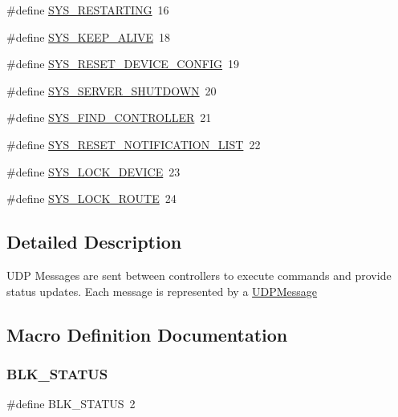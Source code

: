 \begin{DoxyCompactItemize}
\#define \hyperlink{group___u_d_p_message_i_d_ga9ed42f3a7fcc253fa49ce8ff33a75422}{S\+Y\+S\+\_\+\+R\+E\+S\+T\+A\+R\+T\+I\+NG}~16
\item 
\#define \hyperlink{group___u_d_p_message_i_d_ga596f44c285ab391c72addd0e803b0fc4}{S\+Y\+S\+\_\+\+K\+E\+E\+P\+\_\+\+A\+L\+I\+VE}~18
\item 
\#define \hyperlink{group___u_d_p_message_i_d_gaef042a9ee57e8ddf94286a3263734468}{S\+Y\+S\+\_\+\+R\+E\+S\+E\+T\+\_\+\+D\+E\+V\+I\+C\+E\+\_\+\+C\+O\+N\+F\+IG}~19
\item 
\#define \hyperlink{group___u_d_p_message_i_d_ga3021efce231e9a711d6f498630327086}{S\+Y\+S\+\_\+\+S\+E\+R\+V\+E\+R\+\_\+\+S\+H\+U\+T\+D\+O\+WN}~20
\item 
\#define \hyperlink{group___u_d_p_message_i_d_gadfda0e5a5a6a08de555dd55182a4cd87}{S\+Y\+S\+\_\+\+F\+I\+N\+D\+\_\+\+C\+O\+N\+T\+R\+O\+L\+L\+ER}~21
\item 
\#define \hyperlink{group___u_d_p_message_i_d_gab96f76ffa1af60bebfd871ca1e7c4a08}{S\+Y\+S\+\_\+\+R\+E\+S\+E\+T\+\_\+\+N\+O\+T\+I\+F\+I\+C\+A\+T\+I\+O\+N\+\_\+\+L\+I\+ST}~22
\item 
\#define \hyperlink{group___u_d_p_message_i_d_ga42644954a92421cfe92c2e3d20f795ce}{S\+Y\+S\+\_\+\+L\+O\+C\+K\+\_\+\+D\+E\+V\+I\+CE}~23
\item 
\#define \hyperlink{group___u_d_p_message_i_d_ga9ba07526db57f9ec44d01fe3eba9cc60}{S\+Y\+S\+\_\+\+L\+O\+C\+K\+\_\+\+R\+O\+U\+TE}~24
\end{DoxyCompactItemize}


\subsection{Detailed Description}
U\+DP Messages are sent between controllers to execute commands and provide status updates. Each message is represented by a \hyperlink{class_u_d_p_message}{U\+D\+P\+Message} 

\subsection{Macro Definition Documentation}
\mbox{\label{group___u_d_p_message_i_d_gaf8a3426c6f740f351255d50cdda3c9f8}} 
\subsubsection{\texorpdfstring{B\+L\+K\+\_\+\+S\+T\+A\+T\+US}{BLK\_STATUS}}
{\footnotesize\ttfamily \#define B\+L\+K\+\_\+\+S\+T\+A\+T\+US~2}

